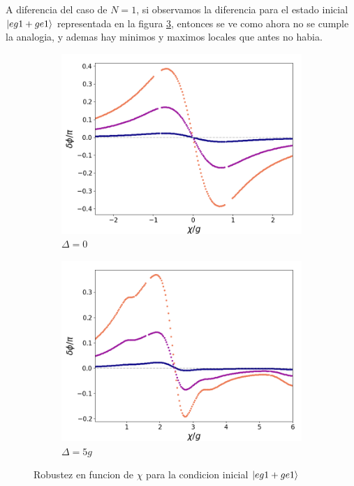 A diferencia del caso de $N=1$, si observamos la diferencia para el estado inicial $\ket{eg1+ge1}$ representada en la figura \ref{fig5:robustez kerr eg1}, entonces se ve como ahora no se cumple la analogia, y ademas hay minimos y maximos locales que antes no habia. 

\begin{figure}[h]
    \centering
    \begin{subfigure}{0.49\textwidth}
        \includegraphics[width=\textwidth]{figuras/ch5/robustez/chi/eg1+ge1 chi zoom.png}
        \caption{$\Delta=0$}
        \label{fig5:robustez kerr 1 eg1}
    \end{subfigure}
    \hfill
    \begin{subfigure}{0.49\textwidth}
        \includegraphics[width=\textwidth]{figuras/ch5/robustez/chi/eg1+ge1 chi d=5.0g.png}
        \caption{$\Delta=5g$}
        \label{fig5:robustez kerr 2 eg1}
    \end{subfigure}
    \caption{Robustez en funcion de $\chi$ para la condicion inicial $\ket{eg1+ge1}$}
    \label{fig5:robustez kerr eg1}
\end{figure}

